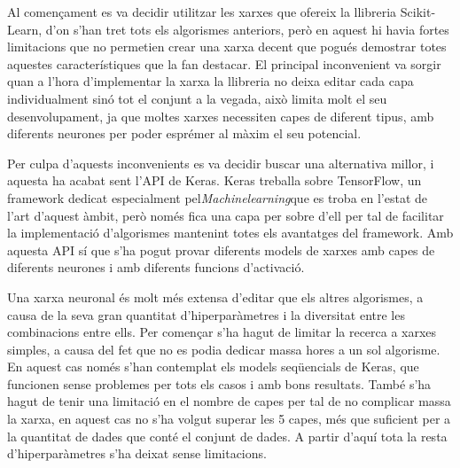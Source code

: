 \documentclass[10pt,a4paper,twocolumn,twoside]{article}
\begin{document}
Al començament es va decidir utilitzar les xarxes que ofereix la llibreria Scikit-Learn, d'on s'han tret tots els algorismes anteriors, però en aquest hi havia fortes limitacions que no permetien crear una xarxa decent que pogués demostrar totes aquestes característiques que la fan destacar. El principal inconvenient va sorgir quan a l'hora d'implementar la xarxa la llibreria no deixa editar cada capa individualment sinó tot el conjunt a la vegada, això limita molt el seu desenvolupament, ja que moltes xarxes necessiten capes de diferent tipus, amb diferents neurones per poder esprémer al màxim el seu potencial.

Per culpa d'aquests inconvenients es va decidir buscar una alternativa millor, i aquesta ha acabat sent l'API de Keras. Keras treballa sobre TensorFlow, un framework dedicat especialment pel\textit{Machinelearning}que es troba en l'estat de l'art d'aquest àmbit, però només fica una capa per sobre d'ell per tal de facilitar la implementació d'algorismes mantenint totes els avantatges del framework. Amb aquesta API sí que s'ha pogut provar diferents models de xarxes amb capes de diferents neurones i amb diferents funcions d'activació.

Una xarxa neuronal és molt més extensa d'editar que els altres algorismes, a causa de la seva gran quantitat d'hiperparàmetres i la diversitat entre les combinacions entre ells. Per començar s'ha hagut de limitar la recerca a xarxes simples, a causa del fet que no es podia dedicar massa hores a un sol algorisme. En aquest cas només s'han contemplat els models seqüencials de Keras, que funcionen sense problemes per tots els casos i amb bons resultats. També s'ha hagut de tenir una limitació en el nombre de capes per tal de no complicar massa la xarxa, en aquest cas no s'ha volgut superar les 5 capes, més que suficient per a la quantitat de dades que conté el conjunt de dades. A partir d'aquí tota la resta d'hiperparàmetres s'ha deixat sense limitacions.
\end{document}
